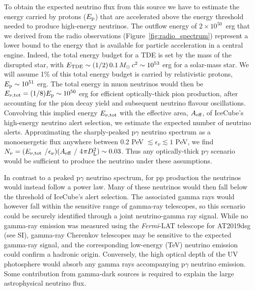 To obtain the expected neutrino flux from this source we have to estimate the energy carried by protons ($E_{\textup{p}}$) that are accelerated above the energy threshold needed to produce high-energy neutrinos. 
The outflow energy of $2 \times 10^{50}$~erg that we derived from the radio observations (Figure~\ref{fig:radio_spectrum}) represent a lower bound to the energy that is available for particle acceleration in a central engine.  Indeed, the total energy budget for a TDE is set by the mass of the disrupted star, with $E_{\textup{TDE}} \sim (1/2)\, 0.1 \, \mbox{$M_{\odot}$} \, c^{2} \sim 10^{53}$ erg for a solar-mass star. We will assume 1\% of this total energy budget is carried by relativistic protons, $E_{\textup{p}} \sim 10^{51}$ erg. The total energy in muon neutrinos would then be $E_{\nu, \textup{tot}} = (1/8) E_{\textup{p}} \sim 10^{50}$ erg for efficient optically-thick pion production, after accounting for the pion decay yield and subsequent neutrino flavour oscillations. Convolving this implied energy $E_{\nu, \textup{tot}}$ with the effective area, $A_{\textup{eff}}$, of IceCube's high-energy neutrino alert selection\cite{2019ICRC...36.1021B}, we estimate the expected number of neutrino alerts. Approximating the sharply-peaked p$\gamma$ neutrino spectrum as a monoenergetic flux anywhere between  0.2 PeV $\lesssim \epsilon_\nu \lesssim 1$ PeV, we find $N_\nu = (E_{\nu, \textup{tot}}$ /$\epsilon_\nu)(A_{\textup{eff}}$ / 4$\pi D_{\textup{L}}^{2})  \sim 0.03$. Thus any optically-thick p$\gamma$ scenario would be sufficient to produce the neutrino under these assumptions. 

In contrast to a peaked p$\gamma$ neutrino spectrum, for pp production the neutrinos would instead follow a power law. Many of these neutrinos would then fall below the threshold of IceCube's alert selection. The associated gamma rays would however fall within the sensitive range of gamma-ray telescopes, so this scenario could be securely identified through a joint neutrino-gamma ray signal. While no gamma-ray emission was measured using the \textit{Fermi}-LAT telescope for AT2019dsg (see SI), gamma-ray Cherenkov telescopes may be sensitive to the expected gamma-ray signal, and the corresponding low-energy (TeV) neutrino emission could confirm a hadronic origin. Conversely, the high optical depth of the UV photosphere would absorb any gamma rays accompanying p$\gamma$ neutrino emission\cite{2016PhRvD..93h3005W}. Some contribution from gamma-dark sources is required to explain the large astrophysical neutrino flux\cite{2016PhRvL.116g1101M}.

